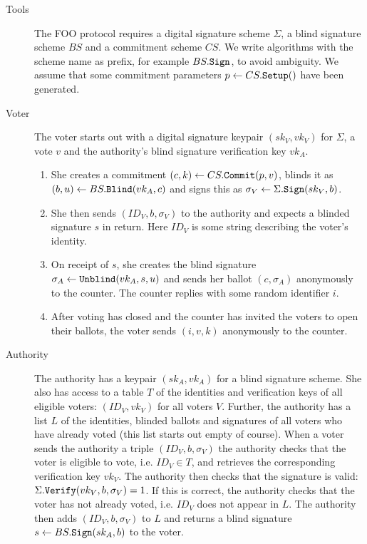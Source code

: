 \documentclass[envcountsame]{llncs}
\newcommand{\alg}[1]{\textup{\texttt{#1}}}
\begin{document}
\begin{description}
\item[Tools] The FOO protocol requires a digital signature scheme $\Sigma$, a
blind signature scheme $BS$ and a commitment scheme $CS$.
We write algorithms with the scheme name as prefix, for example $BS.\alg{Sign}$,
to avoid ambiguity. We assume that some commitment parameters
$p \gets CS.\alg{Setup}()$ have been generated.

\item[Voter] The voter starts out with a digital signature keypair $(sk_V,
vk_V)$ for $\Sigma$, a vote $v$ and the authority's blind signature
verification key $vk_A$.
\begin{enumerate}
\item She creates a commitment $(c, k) \gets CS.\alg{Commit}(p, v)$, blinds it
as $(b, u) \gets BS.\alg{Blind}(vk_A, c)$ and signs this as $\sigma_V \gets
\Sigma.\alg{Sign}(sk_V, b)$.
\item She then sends $(ID_V, b, \sigma_V)$ to the authority and expects a
blinded signature $s$ in return. Here $ID_V$ is some string describing the
voter's identity.
\item On receipt of $s$, she creates the blind signature $\sigma_A \gets \alg{Unblind}(vk_A, s, u)$ and sends her ballot $(c, \sigma_A)$ anonymously to the counter. The counter replies with some random identifier $i$.
\item After voting has closed and the counter has invited the voters to open
their ballots, the voter sends $(i, v, k)$ anonymously to the counter.
\end{enumerate}

\item[Authority]
The authority has a keypair $(sk_A, vk_A)$ for a blind signature scheme. She
also has access to a table $T$ of the identities and verification keys of all
eligible voters: $(ID_V, vk_V)$ for all voters $V$.
Further, the authority has a list $L$ of the identities, blinded ballots
and signatures of all voters who have already voted (this list starts out empty
of course).
When a voter sends the authority a triple $(ID_V, b, \sigma_V)$ the
authority checks that the voter is eligible to vote, i.e. $ID_V \in T$, and retrieves the corresponding verification key $vk_V$.
The authority then checks that the signature is valid: $\Sigma.\alg{Verify}(vk_V, b, \sigma_V) = 1$. If this is correct, the authority checks that the voter has not already voted, i.e. $ID_V$ does not appear in $L$.
The authority then adds $(ID_V, b, \sigma_V)$ to $L$ and returns a blind
signature $s \gets BS.\alg{Sign}(sk_A, b)$ to the voter.


\end{description}
\end{document}
